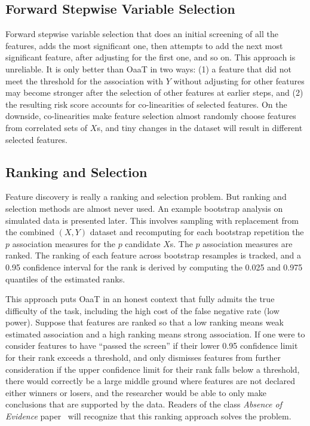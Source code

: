\subsection{Forward Stepwise Variable Selection}
Forward stepwise variable selection that does an initial
screening of all the features, adds the most significant one, then
attempts to add the next most significant feature, after adjusting
for the first one, and so on.  This approach is unreliable.  It is
only better than OaaT in two ways: (1) a feature that did not meet the
threshold for the association with $Y$ without adjusting for other
features may become stronger after the selection of other features at
earlier steps, and (2) the resulting risk score accounts for
co-linearities of selected features.  On the downside, co-linearities
make feature selection almost randomly choose features from correlated
sets of $X$s, and tiny changes in the dataset will result in different
selected features. 

\subsection{Ranking and Selection}
Feature discovery is really a ranking and selection problem.  But ranking and selection methods are almost never used.  An example bootstrap analysis on simulated data is presented later.  This involves sampling with replacement from the combined $(X, Y)$ dataset and recomputing for each bootstrap repetition the $p$ association measures for the $p$ candidate $X$s.  The $p$ association measures are ranked.  The ranking of each feature across bootstrap resamples is tracked, and a 0.95 confidence interval for the rank is derived by computing the 0.025 and 0.975 quantiles of the estimated ranks.

This approach puts OaaT in an honest context that fully admits the true difficulty of the task, including the high cost of the false negative rate (low power).  Suppose that features are ranked so that a low ranking means weak estimated association and a high ranking means strong association.  If one were to consider features to have ``passed the screen'' if their lower 0.95 confidence limit for their rank exceeds a threshold, and only dismisses features from further consideration if the upper confidence limit for their rank falls below a threshold, there would correctly be a large middle ground where features are not declared either winners or losers, and the researcher would be able to only make conclusions that are supported by the data.  Readers of the class \emph{Absence of Evidence} paper~\cite{alt95abs} will recognize that this ranking approach solves the problem.

